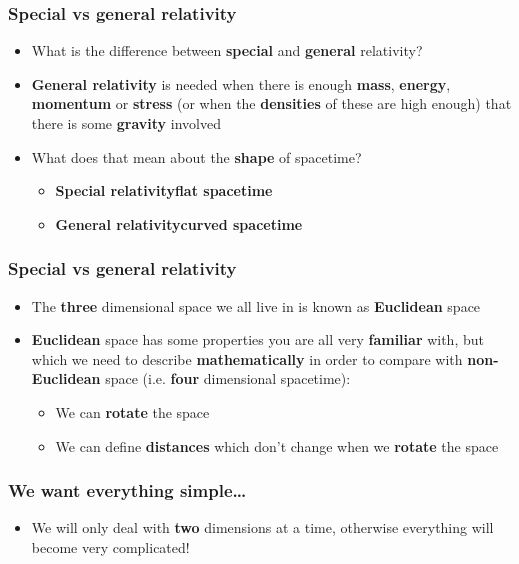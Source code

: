 \documentclass{beamer}
\begin{document}
\begin{frame}
  \frametitle{Special vs general relativity}
  \begin{itemize}
    \item<1-> What is the difference between \textbf{special} and \textbf{general} relativity?
    \item<2-> \textbf{General relativity} is needed when there is enough \textbf{mass}, \textbf{energy}, \textbf{momentum} or \textbf{stress} (or when the \textbf{densities} of these are high enough) that there is some \textbf{gravity} involved
    \item<3-> What does that mean about the \textbf{shape} of spacetime?
      \begin{itemize}
	\item<4-> \textbf{Special relativity}\to\textbf{flat spacetime}
	\item<5-> \textbf{General relativity}\to\textbf{curved spacetime}
      \end{itemize}
  \end{itemize}
\end{frame}

\begin{frame}
  \frametitle{Special vs general relativity}
  \begin{itemize}
    \item<1-> The \textbf{three} dimensional space we all live in is known as \textbf{Euclidean} space
    \item<2-> \textbf{Euclidean} space has some properties you are all very \textbf{familiar} with, but which we need to describe \textbf{mathematically} in order to compare with \textbf{non-Euclidean} space (i.e. \textbf{four} dimensional spacetime):
      \begin{itemize}
	\item<3-> We can \textbf{rotate} the space
	\item<4-> We can define \textbf{distances} which don't change when we \textbf{rotate} the space
      \end{itemize}
  \end{itemize}
\end{frame}

\begin{frame}
  \frametitle{We want everything simple\ldots}
  \begin{itemize}
    \item<1-> We will only deal with \textbf{two} dimensions at a time, otherwise everything will become very complicated!
  \end{itemize}
\end{frame}
\end{document}
